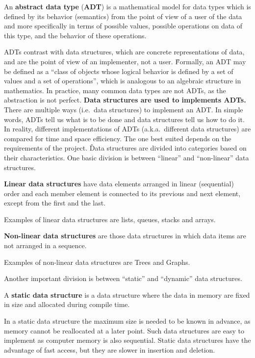 An \textbf{abstract data type} (\textbf{ADT}) is a mathematical model for data types which is defined by its behavior
(semantics) from the point of view of a user of the data and more specifically in terms of possible values, possible
operations on data of this type, and the behavior of these operations.
\ed

ADTs contrast with data structures, which are concrete representations of data, and are the point of view of an
implementer, not a user. \v

Formally, an ADT may be defined as a ``class of objects whose logical behavior is defined by a set of values and a
set of operations'', which is analogous to an algebraic structure in mathematics. In practice, many common data types
are not ADTs, as the abstraction is not perfect. \v

\textbf{Data structures are used to implements ADTs.} There are multiple ways (i.e.\ data structures) to implement an
ADT. In simple words, ADTs tell us what is to be done and data structures tell us how to do it. In reality, different
implementations of ADTs (a.k.a.\ different data structures) are compared for time and space efficiency. The one best
suited depends on the requirements of the project. \v

Data structures are divided into categories based on their characteristics. One basic division is between ``linear''
and ``non-linear'' data structures.

\textbf{Linear data structures} have data elements arranged in linear (sequential) order and each member element is
connected to its previous and next element, except from the first and the last.
\ed

\be
Examples of linear data structures are lists, queues, stacks and arrays.
\ee

\textbf{Non-linear data structures} are those data structures in which data items are not arranged in a sequence.
\ed

\be
Examples of non-linear data structures are Trees and Graphs.
\ee

Another important division is between ``static'' and ``dynamic'' data structures.

A \textbf{static data structure} is a data structure where the data in memory are fixed in size and allocated during
compile time.
\ed

In a static data structure the maximum size is needed to be known in advance, as memory cannot be reallocated at a
later point. Such data structures are easy to implement as computer memory is also sequential. Static data structures
have the advantage of fast access, but they are slower in insertion and deletion.

